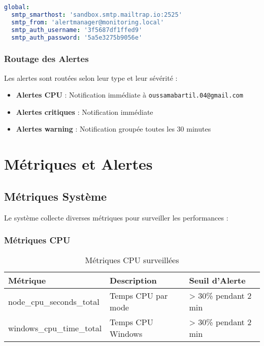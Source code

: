 \documentclass[12pt,a4paper]{report}
\newcommand{\code}[1]{\texttt{\color{primaryblue}#1}}
\begin{document}
\begin{lstlisting}[language=yaml, caption=Configuration SMTP pour Mailtrap]
global:
  smtp_smarthost: 'sandbox.smtp.mailtrap.io:2525'
  smtp_from: 'alertmanager@monitoring.local'
  smtp_auth_username: '3f5687df1ffed9'
  smtp_auth_password: '5a5e3275b9056e'
\end{lstlisting}

\subsection{Routage des Alertes}

Les alertes sont routées selon leur type et leur sévérité :

\begin{itemize}
    \item \textbf{Alertes CPU} : Notification immédiate à \code{oussamabartil.04@gmail.com}
    \item \textbf{Alertes critiques} : Notification immédiate
    \item \textbf{Alertes warning} : Notification groupée toutes les 30 minutes
\end{itemize}

\chapter{Métriques et Alertes}

\section{Métriques Système}

Le système collecte diverses métriques pour surveiller les performances :

\subsection{Métriques CPU}

\begin{table}[H]
\centering
\begin{tabular}{|l|l|l|}
\hline
\textbf{Métrique} & \textbf{Description} & \textbf{Seuil d'Alerte} \\
\hline
node\_cpu\_seconds\_total & Temps CPU par mode & > 30\% pendant 2 min \\
\hline
windows\_cpu\_time\_total & Temps CPU Windows & > 30\% pendant 2 min \\
\hline
\end{tabular}
\caption{Métriques CPU surveillées}
\label{tab:cpu-metrics}
\end{table}
\end{document}
